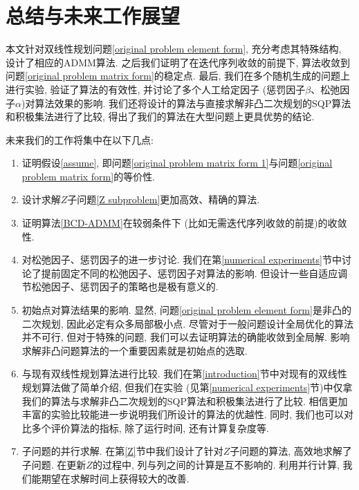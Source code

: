 \documentclass[UTF8,10.5pt,a4paper]{ctexart}
\theoremstyle{definition}
\theoremstyle{definition}
\begin{document}
\newpage
\section{总结与未来工作展望}\label{conclusion}
本文针对双线性规划问题\eqref{original problem element form}, 充分考虑其特殊结构, 设计了相应的ADMM算法. 之后我们证明了在迭代序列收敛的前提下, 算法收敛到问题\eqref{original problem matrix form}的稳定点. 最后, 我们在多个随机生成的问题上进行实验, 验证了算法的有效性, 并讨论了多个人工给定因子 (惩罚因子$\beta$、松弛因子$\alpha$)对算法效果的影响. 我们还将设计的算法与直接求解非凸二次规划的SQP算法和积极集法进行了比较, 得出了我们的算法在大型问题上更具优势的结论. 
\par 未来我们的工作将集中在以下几点:
\begin{enumerate}
\item 证明假设\ref{assume}, 即问题\eqref{original problem matrix form 1}与问题\eqref{original problem matrix form}的等价性. 
\item 设计求解$Z$子问题\eqref{Z subproblem}更加高效、精确的算法.
\item 证明算法\ref{BCD-ADMM}在较弱条件下 (比如无需迭代序列收敛的前提)的收敛性.
\item 对松弛因子、惩罚因子的进一步讨论. 我们在第\ref{numerical experiments}节中讨论了提前固定不同的松弛因子、惩罚因子对算法的影响. 但设计一些自适应调节松弛因子、惩罚因子的策略也是极有意义的.
\item 初始点对算法结果的影响. 显然, 问题\eqref{original problem element form}是非凸的二次规划, 因此必定有众多局部极小点. 尽管对于一般问题设计全局优化的算法并不可行, 但对于特殊的问题, 我们可以去证明算法的确能收敛到全局解. 影响求解非凸问题算法的一个重要因素就是初始点的选取.
\item 与现有双线性规划算法进行比较. 我们在第\ref{introduction}节中对现有的双线性规划算法做了简单介绍, 但我们在实验 (见第\ref{numerical experiments}节)中仅拿我们的算法与求解非凸二次规划的SQP算法和积极集法进行了比较. 相信更加丰富的实验比较能进一步说明我们所设计的算法的优越性. 同时, 我们也可以对比多个评价算法的指标, 除了运行时间, 还有计算复杂度等. 
\item 子问题的并行求解. 在第\ref{Z}节中我们设计了针对$Z$子问题的算法, 高效地求解了子问题. 在更新$Z$的过程中, 列与列之间的计算是互不影响的. 利用并行计算, 我们能期望在求解时间上获得较大的改善.
\end{enumerate}

\newpage
\makeatletter
\renewenvironment{thebibliography}[1]
{\section*{\refname}%
	\@mkboth{\MakeUppercase\refname}{\MakeUppercase\refname}%
	\list{\@biblabel{\@arabic\c@enumiv}}%
	{\settowidth\labelwidth{\@biblabel{#1}}%
		\leftmargin\labelwidth
		\advance\leftmargin\labelsep
		\advance\leftmargin by 0em%
		\itemindent 0em%
		\@openbib@code
		\usecounter{enumiv}%
		\let\p@enumiv\@empty
		\renewcommand\theenumiv{\@arabic\c@enumiv}}%
	\sloppy
	\clubpenalty4000
	\@clubpenalty \clubpenalty
	\widowpenalty4000%
	\sfcode`\.\@m}
{\def\@noitemerr
	{\@latex@warning{Empty `thebibliography' environment}}%
	\endlist}
\makeatother
\end{document}
